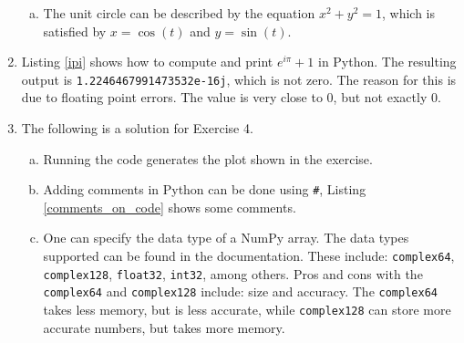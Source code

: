 \begin{enumerate}
\begin{enumerate}[a)]
\item The unit circle can be described by the equation $x^{2} + y^{2} = 1$, which is satisfied by $x=\cos(t)$ and $y =\sin(t)$. 
\end{enumerate}


\item Listing \ref{ipi} shows how to compute and print $e^{i\pi}+1$ in Python. The resulting output is \verb|1.2246467991473532e-16j|, which is not zero.
The reason for this is due to floating point errors. The value is very close to 0, but not exactly 0. 



\item The following is a solution for Exercise 4.

\begin{enumerate}[a)]
\item Running the code generates the plot shown in the exercise. 

\item Adding comments in Python can be done using \verb|#|, Listing \ref{comments_on_code} shows some comments.


\item One can specify the data type of a NumPy array. The data types supported can be found in the documentation. 
These include: \verb|complex64|, \verb|complex128|, \verb|float32|, \verb|int32|, among others. 
Pros and cons with the \verb|complex64| and \verb|complex128| include: size and accuracy. The \verb|complex64|
takes less memory, but is less accurate, while \verb|complex128| can store more accurate numbers, but takes more memory.

\end{enumerate}





\end{enumerate}
